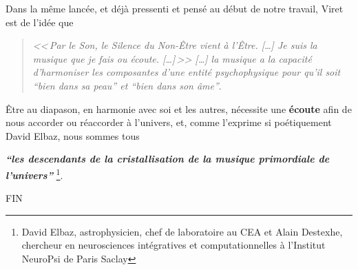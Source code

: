 
 


Dans la même lancée, et déjà pressenti et  pensé au début de notre travail, Viret
est de l'idée que\label{jeSuisLaMusique:viret}
\begin{quotation}
\emph{<<\,\emph{Par le Son, le Silence du Non-Être vient à l'Être}. [\dots] 
\textsl{Je suis}
	\emph{la musique que je fais ou écoute}. [\dots]\,>>
[\ldots] \emph{la musique a la capacité d'harmoniser
les composantes d'une entité psychophysique pour qu'il soit ``bien
dans sa peau'' et ``bien dans son âme}''}.\, \autocite[ch. 1, p.8]{viret:b}
\end{quotation}
Être au diapason, en harmonie avec soi et les autres,
nécessite une\textbf{ écoute } afin de nous accorder ou réaccorder à
l'univers, et, comme l'exprime si poétiquement David Elbaz, nous
sommes tous


\textit{\textbf{``les descendants de la  cristallisation de la musique primordiale de
l'univers''}} \autocite{delbaz_recherche_2016} \footnote{David Elbaz, astrophysicien, chef de laboratoire au CEA et Alain
Destexhe, chercheur en neurosciences intégratives et computationnelles
à l'Institut  NeuroPsi de Paris Saclay}.



\begin{center}
  FIN
\end{center}











